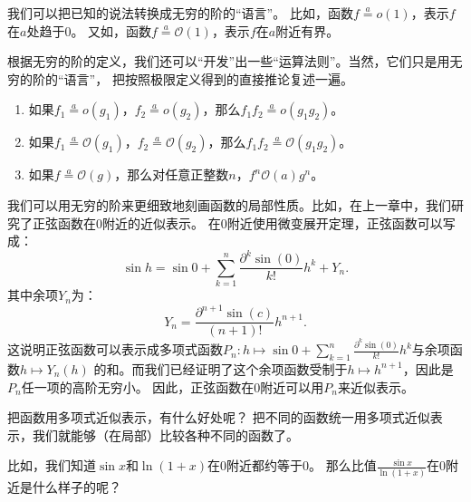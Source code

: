 \documentclass[12pt,UTF8]{ctexbook}
\newcommand{\oveq}[1]{\overset{#1}{=}}
\newcommand{\olim}[1]{\mathit{o}\left(#1\right)}  %
\newcommand{\Olim}[1]{\mathcal{O}\left(#1\right)}  %
\theoremstyle{definition}
\theoremstyle{plain}
\begin{document}
我们可以把已知的说法转换成无穷的阶的“语言”。
比如，函数$f \oveq{a} \olim{1}$，表示$f$在$a$处趋于$0$。
又如，函数$f \oveq{a} \Olim{1}$，表示$f$在$a$附近有界。

根据无穷的阶的定义，我们还可以“开发”出一些“运算法则”。当然，它们只是用无穷的阶的“语言”，
把按照极限定义得到的直接推论复述一遍。
\begin{enumerate}
    \item 如果$f_1 \oveq{a} \olim{g_1}$，$f_2 \oveq{a} \olim{g_2}$，那么$f_1 f_2 \oveq{a} \olim{g_1 g_2}$。
    \item 如果$f_1 \oveq{a} \Olim{g_1}$，$f_2 \oveq{a} \Olim{g_2}$，那么$f_1 f_2 \oveq{a} \Olim{g_1 g_2}$。
    \item 如果$f \oveq{a} \Olim{g}$，那么对任意正整数$n$，$f^n \Olim{a}{g^n}$。
\end{enumerate}

我们可以用无穷的阶来更细致地刻画函数的局部性质。比如，在上一章中，我们研究了正弦函数在$0$附近的近似表示。
在$0$附近使用微变展开定理，正弦函数可以写成：
$$ \sin{h} = \sin{0} + \sum_{k=1}^n \frac{\partial^k \sin (0)}{k!}h^k + Y_n. $$
其中余项$Y_n$为：
$$ Y_n = \frac{\partial^{n+1} \sin (c)}{(n+1)!}h^{n+1}. $$
这说明正弦函数可以表示成多项式函数$P_n :h \mapsto \sin{0} + \sum_{k=1}^n \frac{\partial^k \sin (0)}{k!}h^k$与余项函数$h\mapsto Y_n(h)$
的和。而我们已经证明了这个余项函数受制于$h\mapsto h^{n+1}$，因此是$P_n$任一项的高阶无穷小。
因此，正弦函数在$0$附近可以用$P_n$来近似表示。

把函数用多项式近似表示，有什么好处呢？
把不同的函数统一用多项式近似表示，我们就能够（在局部）比较各种不同的函数了。

比如，我们知道$\sin{x}$和$\ln{(1+x)}$在$0$附近都约等于$0$。
那么比值$\frac{\sin{x}}{\ln{(1 + x)}}$在$0$附近是什么样子的呢？
\end{document}
